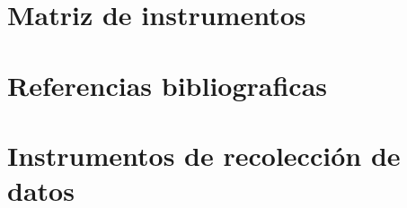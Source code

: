 \section{Matriz de instrumentos}
\section{Referencias bibliograficas}
\section{Instrumentos de recolección de datos}
